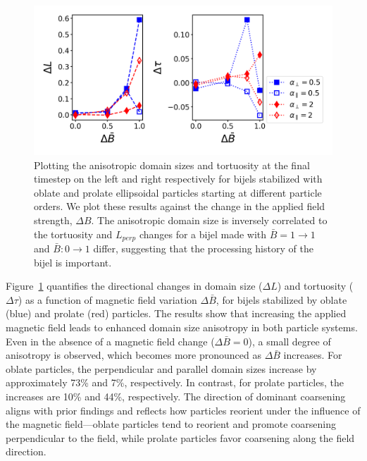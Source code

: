 \begin{figure} 
\centering 
\includegraphics[scale = 0.6]{../figures/results/paper2/domain_size_aniso-field_up.png} 
\caption{Plotting the anisotropic domain sizes and tortuosity at the final timestep on the left and right respectively for bijels stabilized with 
         oblate and prolate ellipsoidal particles starting at different particle orders. We plot these results against the change in the applied field 
         strength, $\Delta B$. The anisotropic domain size is inversely correlated to the tortuosity and $L_{perp}$ changes for 
         a bijel made with $\bar{B} = 1 \rightarrow 1$ and $\bar{B}: 0 \rightarrow 1$ differ, suggesting that the processing history of the bijel is important.} 
\label{fig:domain_size_aniso-field_up} 
\end{figure}

Figure~\ref{fig:domain_size_aniso-field_up} quantifies the directional changes in domain size (\(\Delta L\)) and tortuosity (\(\Delta \tau\)) as a 
function of magnetic field variation \(\Delta \bar{B}\), for bijels stabilized by oblate (blue) and prolate (red) particles. The results show that 
increasing the applied magnetic field leads to enhanced domain size anisotropy in both particle systems. Even in the absence of a magnetic field 
change (\(\Delta \bar{B} = 0\)), a small degree of anisotropy is observed, which becomes more pronounced as \(\Delta \bar{B}\) increases. For oblate 
particles, the perpendicular and parallel domain sizes increase by approximately 73\% and 7\%, respectively. In contrast, for prolate particles, the 
increases are 10\% and 44\%, respectively. The direction of dominant coarsening aligns with prior findings and reflects how particles reorient under 
the influence of the magnetic field—oblate particles tend to reorient and promote coarsening perpendicular to the field, while prolate particles favor 
coarsening along the field direction.


